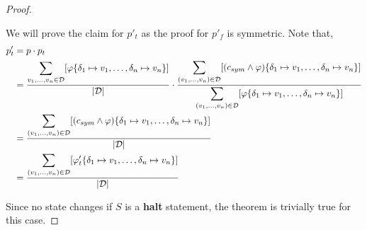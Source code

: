 \documentclass[acmsmall,review,anonymous]{acmart}\settopmatter{printfolios=true,printccs=false,printacmref=false}
\DeclarePairedDelimiter{\abs}{\lvert}{\rvert}
\begin{document}
\begin{proof}
\begin{itemize}
    We will prove the claim for $p'_t$ as the proof for $p'_f$ is symmetric.
    Note that,
    \begin{align*}
      p'_t &= p \cdot p_t \\
           &= \frac{\displaystyle\sum_{v_1,\ldots,v_n \in \mathcal{D}} [ \varphi\{\delta_1 \mapsto v_1, \ldots, \delta_n \mapsto v_n\} ]}{\abs{\mathcal{D}}} \cdot \frac{\displaystyle\sum_{(v_1,\ldots,v_n) \in \mathcal{D}} [(c_{sym} \wedge \varphi)\{\delta_1 \mapsto v_1,\ldots,\delta_n \mapsto v_n\}]}{\displaystyle\sum_{(v_1,\ldots,v_n) \in \mathcal{D}}[\varphi\{\delta_1 \mapsto v_1,\ldots,\delta_n \mapsto v_n\}]} \\
           &= \frac{\displaystyle\sum_{(v_1,\ldots,v_n) \in \mathcal{D}} [(c_{sym} \wedge \varphi)\{\delta_1 \mapsto v_1,\ldots,\delta_n \mapsto v_n\}]}{\abs{\mathcal{D}}}\\
           &= \frac{\displaystyle\sum_{(v_1,\ldots,v_n) \in \mathcal{D}} [\varphi'_t\{\delta_1 \mapsto v_1,\ldots,\delta_n \mapsto v_n\}]}{\abs{\mathcal{D}}}
    \end{align*}
  \end{itemize}
  Since no state changes if $S$ is a \textbf{halt} statement, the theorem is trivially true for this case.
\end{proof}
\end{document}
